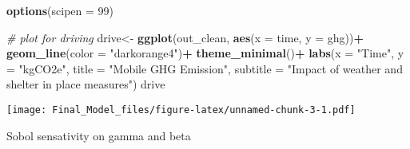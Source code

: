 \documentclass[]{article}
\newenvironment{Shaded}{\begin{snugshade}}{\end{snugshade}}
\newcommand{\KeywordTok}[1]{\textcolor[rgb]{0.13,0.29,0.53}{\textbf{#1}}}
\newcommand{\DataTypeTok}[1]{\textcolor[rgb]{0.13,0.29,0.53}{#1}}
\newcommand{\DecValTok}[1]{\textcolor[rgb]{0.00,0.00,0.81}{#1}}
\newcommand{\StringTok}[1]{\textcolor[rgb]{0.31,0.60,0.02}{#1}}
\newcommand{\CommentTok}[1]{\textcolor[rgb]{0.56,0.35,0.01}{\textit{#1}}}
\newcommand{\OperatorTok}[1]{\textcolor[rgb]{0.81,0.36,0.00}{\textbf{#1}}}
\newcommand{\NormalTok}[1]{#1}
\begin{document}
\begin{Shaded}
\begin{Highlighting}[]
\KeywordTok{options}\NormalTok{(}\DataTypeTok{scipen =} \DecValTok{99}\NormalTok{)}

\CommentTok{# plot for driving}
\NormalTok{drive<-}\StringTok{ }\KeywordTok{ggplot}\NormalTok{(out_clean, }\KeywordTok{aes}\NormalTok{(}\DataTypeTok{x =}\NormalTok{ time, }\DataTypeTok{y =}\NormalTok{ ghg))}\OperatorTok{+}
\StringTok{  }\KeywordTok{geom_line}\NormalTok{(}\DataTypeTok{color =} \StringTok{"darkorange4"}\NormalTok{)}\OperatorTok{+}
\StringTok{  }\KeywordTok{theme_minimal}\NormalTok{()}\OperatorTok{+}
\StringTok{  }\KeywordTok{labs}\NormalTok{(}\DataTypeTok{x =} \StringTok{"Time"}\NormalTok{, }\DataTypeTok{y =} \StringTok{"kgCO2e"}\NormalTok{, }\DataTypeTok{title =} \StringTok{"Mobile GHG Emission"}\NormalTok{, }\DataTypeTok{subtitle =} \StringTok{"Impact of weather and shelter in place measures"}\NormalTok{)}
\NormalTok{drive}
\end{Highlighting}
\end{Shaded}

\texttt{[image: Final\_Model\_files/figure-latex/unnamed-chunk-3-1.pdf]}

Sobol sensativity on gamma and beta
\end{document}
